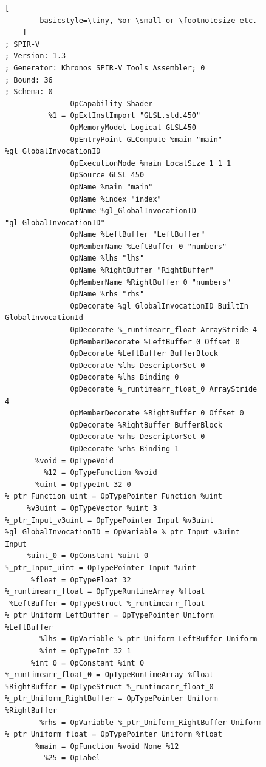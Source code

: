 \documentclass{report}
\begin{document}
\begin{figure}
    
    \begin{lstlisting}[
        basicstyle=\tiny, %or \small or \footnotesize etc.
    ]
; SPIR-V
; Version: 1.3
; Generator: Khronos SPIR-V Tools Assembler; 0
; Bound: 36
; Schema: 0
               OpCapability Shader
          %1 = OpExtInstImport "GLSL.std.450"
               OpMemoryModel Logical GLSL450
               OpEntryPoint GLCompute %main "main" %gl_GlobalInvocationID
               OpExecutionMode %main LocalSize 1 1 1
               OpSource GLSL 450
               OpName %main "main"
               OpName %index "index"
               OpName %gl_GlobalInvocationID "gl_GlobalInvocationID"
               OpName %LeftBuffer "LeftBuffer"
               OpMemberName %LeftBuffer 0 "numbers"
               OpName %lhs "lhs"
               OpName %RightBuffer "RightBuffer"
               OpMemberName %RightBuffer 0 "numbers"
               OpName %rhs "rhs"
               OpDecorate %gl_GlobalInvocationID BuiltIn GlobalInvocationId
               OpDecorate %_runtimearr_float ArrayStride 4
               OpMemberDecorate %LeftBuffer 0 Offset 0
               OpDecorate %LeftBuffer BufferBlock
               OpDecorate %lhs DescriptorSet 0
               OpDecorate %lhs Binding 0
               OpDecorate %_runtimearr_float_0 ArrayStride 4
               OpMemberDecorate %RightBuffer 0 Offset 0
               OpDecorate %RightBuffer BufferBlock
               OpDecorate %rhs DescriptorSet 0
               OpDecorate %rhs Binding 1
       %void = OpTypeVoid
         %12 = OpTypeFunction %void
       %uint = OpTypeInt 32 0
%_ptr_Function_uint = OpTypePointer Function %uint
     %v3uint = OpTypeVector %uint 3
%_ptr_Input_v3uint = OpTypePointer Input %v3uint
%gl_GlobalInvocationID = OpVariable %_ptr_Input_v3uint Input
     %uint_0 = OpConstant %uint 0
%_ptr_Input_uint = OpTypePointer Input %uint
      %float = OpTypeFloat 32
%_runtimearr_float = OpTypeRuntimeArray %float
 %LeftBuffer = OpTypeStruct %_runtimearr_float
%_ptr_Uniform_LeftBuffer = OpTypePointer Uniform %LeftBuffer
        %lhs = OpVariable %_ptr_Uniform_LeftBuffer Uniform
        %int = OpTypeInt 32 1
      %int_0 = OpConstant %int 0
%_runtimearr_float_0 = OpTypeRuntimeArray %float
%RightBuffer = OpTypeStruct %_runtimearr_float_0
%_ptr_Uniform_RightBuffer = OpTypePointer Uniform %RightBuffer
        %rhs = OpVariable %_ptr_Uniform_RightBuffer Uniform
%_ptr_Uniform_float = OpTypePointer Uniform %float
       %main = OpFunction %void None %12
         %25 = OpLabel

\end{lstlisting}
\end{figure}
\end{document}
